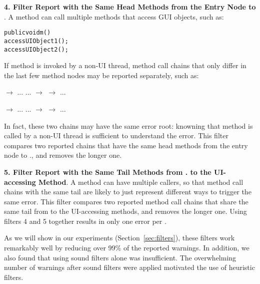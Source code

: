 \textbf{4. Filter Report with the Same Head Methods from the Entry Node to }. A method can call
multiple methods that access GUI objects, such as:
\vspace{-2mm}
\begin{CodeOut}
\begin{alltt}
     public void m() \ttlcb
         accessUIObject1();
         accessUIObject2();
     \ttrcb
\end{alltt}
\end{CodeOut}
\vspace{-2mm}
If method  is invoked by a non-UI thread, method call chains that
only differ in the last few method nodes may be reported separately, such as:

 $\rightarrow$ ... ... $\rightarrow$  $\rightarrow$  ...

 $\rightarrow$ ... ... $\rightarrow$  $\rightarrow$  ...

In fact, these two chains may have the same error root: knowning that
method  is called by a non-UI thread is sufficient to understand
the error.
This filter compares two reported chains that have the same
head methods from the entry node to .,
and removes the longer one.

\textbf{5. Filter Report with the Same Tail Methods from .
to the UI-accessing Method}. A method
can have multiple callers, so that method call chains with the same tail are likely
to just represent different ways to trigger the same error. This filter compares 
two reported method call chains that share the same 
tail from  to the UI-accessing methods, and
removes the longer one. Using filters 4 and 5 together results in
only one error per .



\vspace{1mm}

As we will show in our experiments (Section~\ref{sec:filters}), these filters
work remarkably well by reducing over 99\% of the reported warnings. In addition,
we also found that using sound filters alone was insufficient. The overwhelming
number of warnings after sound filters were applied motivated the use
of heuristic filters.


